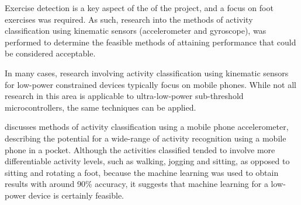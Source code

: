 
	
	Exercise detection is a key aspect of the of the project, and a focus on foot exercises was required. As such, research into the methods of activity classification using kinematic sensors (accelerometer and gyroscope), was performed to determine the feasible methods of attaining performance that could be considered acceptable.
	
	In many cases, research involving activity classification using kinematic sensors for low-power constrained devices typically focus on mobile phones. While not all research in this area is applicable to ultra-low-power sub-threshold microcontrollers, the same techniques can be applied.
	
	\cite{kwapisz2011activity} discusses methods of activity classification using a mobile phone accelerometer, describing the potential for a wide-range of activity recognition using a mobile phone in a pocket. Although the activities classified tended to involve more differentiable activity levels, such as walking, jogging and sitting, as opposed to sitting and rotating a foot, because the machine learning was used to obtain results with around 90\% accuracy, it suggests that machine learning for a low-power device is certainly feasible. 
	
	